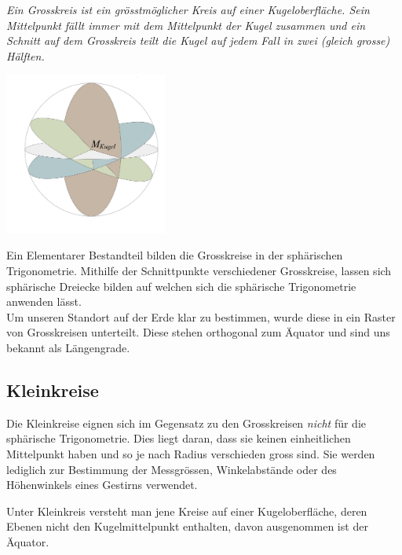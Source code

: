 \begin{refsection}
\begin{definition}
\textit{Ein Grosskreis ist ein grösstmöglicher Kreis auf einer Kugeloberfläche. Sein Mittelpunkt fällt immer mit dem Mittelpunkt der Kugel zusammen und ein Schnitt auf dem Grosskreis teilt die Kugel auf jedem Fall in zwei (gleich grosse) Hälften.}
\label{skript:kugel:satz:Grosskreis}
\end{definition}

\begin{center}
        \includegraphics[width=0.4\textwidth]{kugel/_Grosskreis.jpg}
\end{center}

Ein Elementarer Bestandteil bilden die Grosskreise in der sphärischen Trigonometrie. Mithilfe der Schnittpunkte verschiedener Grosskreise, lassen sich sphärische Dreiecke bilden auf welchen sich die sphärische Trigonometrie anwenden lässt. \\

Um unseren Standort auf der Erde klar zu bestimmen, wurde diese in ein Raster von Grosskreisen unterteilt. Diese stehen orthogonal zum Äquator und sind uns bekannt als Längengrade.


\subsection{Kleinkreise}
Die Kleinkreise eignen sich im Gegensatz zu den Grosskreisen \textit{nicht} für die sphärische Trigonometrie.  Dies liegt daran, dass sie keinen einheitlichen Mittelpunkt haben und so je nach Radius verschieden gross sind.
Sie werden lediglich zur Bestimmung der Messgrössen, Winkelabstände oder des Höhenwinkels eines Gestirns verwendet. 

\begin{definition}
Unter Kleinkreis versteht man jene Kreise auf einer Kugeloberfläche, deren Ebenen nicht den Kugelmittelpunkt enthalten, davon ausgenommen ist der Äquator.
\label{skript:kugel:satz:Kleinkreis}
\end{definition} 


\end{refsection}
